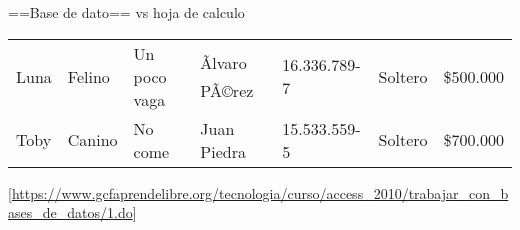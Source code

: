 \documentclass[ignorenonframetext,]{beamer}
\begin{document}
\begin{frame}{==Base de dato== vs hoja de calculo}
\begin{longtable}[c]{@{}lllllll@{}}
\begin{minipage}[t]{0.17\columnwidth}\raggedright\strut
Luna
\strut\end{minipage} &
\begin{minipage}[t]{0.06\columnwidth}\raggedright\strut
Felino
\strut\end{minipage} &
\begin{minipage}[t]{0.08\columnwidth}\raggedright\strut
Un poco vaga
\strut\end{minipage} &
\begin{minipage}[t]{0.07\columnwidth}\raggedright\strut
Ãlvaro PÃ©rez
\strut\end{minipage} &
\begin{minipage}[t]{0.06\columnwidth}\raggedright\strut
16.336.789-7
\strut\end{minipage} &
\begin{minipage}[t]{0.08\columnwidth}\raggedright\strut
Soltero
\strut\end{minipage} &
\begin{minipage}[t]{0.10\columnwidth}\raggedright\strut
\$500.000
\strut\end{minipage}\tabularnewline
\begin{minipage}[t]{0.17\columnwidth}\raggedright\strut
Toby
\strut\end{minipage} &
\begin{minipage}[t]{0.06\columnwidth}\raggedright\strut
Canino
\strut\end{minipage} &
\begin{minipage}[t]{0.08\columnwidth}\raggedright\strut
No come
\strut\end{minipage} &
\begin{minipage}[t]{0.07\columnwidth}\raggedright\strut
Juan Piedra
\strut\end{minipage} &
\begin{minipage}[t]{0.06\columnwidth}\raggedright\strut
15.533.559-5
\strut\end{minipage} &
\begin{minipage}[t]{0.08\columnwidth}\raggedright\strut
Soltero
\strut\end{minipage} &
\begin{minipage}[t]{0.10\columnwidth}\raggedright\strut
\$700.000
\strut\end{minipage}\tabularnewline
\bottomrule
\end{longtable}

\end{frame}

\begin{frame}

{[}\url{https://www.gcfaprendelibre.org/tecnologia/curso/access_2010/trabajar_con_bases_de_datos/1.do}{]}

\end{frame}
\end{document}
